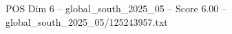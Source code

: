 \begin{textsample}{POS Dim 6 – global\_south\_2025\_05 – Score 6.00 – global\_south\_2025\_05/125243957.txt}
\end{textsample}
